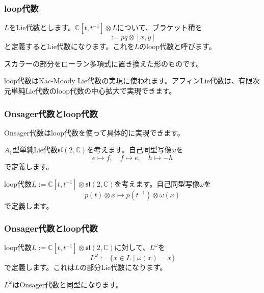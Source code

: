 \documentclass{beamer}
\begin{document}
\begin{frame}
    \frametitle{loop代数}

    \begin{definition}[loop代数]
        $L$をLie代数とします。$ℂ[t,t^{-1}]⊗L$について、ブラケット積を
        \begin{equation}
            [p⊗x,q⊗y]:=pq⊗[x,y]
        \end{equation}
        と定義するとLie代数になります。これを$L$のloop代数と呼びます。
    \end{definition}

    スカラーの部分をローラン多項式に置き換えた形のものです。

    \bigskip

    loop代数はKac-Moody Lie代数の実現に使われます。アフィンLie代数は、有限次元単純Lie代数のloop代数の中心拡大で実現できます。
\end{frame}

\begin{frame}
    \frametitle{Onsager代数とloop代数}

    Onsager代数はloop代数を使って具体的に実現できます。

    \bigskip

    \begin{definition}
        $A_1$型単純Lie代数$\mathfrak{sl}(2,ℂ)$を考えます。自己同型写像$ω$を
        \begin{equation}
            e↦f, \quad f↦e, \quad h↦-h
        \end{equation}
        で定義します。
    \end{definition}

    \begin{definition}
        loop代数$L:=ℂ[t,t^{-1}]⊗\mathfrak{sl}(2,ℂ)$を考えます。自己同型写像$ω$を
        \begin{equation}
            p(t)⊗x↦p(t^{-1})⊗ω(x)
        \end{equation}
        で定義します。
    \end{definition}
\end{frame}

\begin{frame}
    \frametitle{Onsager代数とloop代数}

    \begin{definition}
        loop代数$L:=ℂ[t,t^{-1}]⊗\mathfrak{sl}(2,ℂ)$に対して、$L^ω$を
        \begin{equation}
            L^ω:=\{x∈L∣ω(x)=x\}
        \end{equation}
        で定義します。これは$L$の部分Lie代数になります。
    \end{definition}

    \begin{theorem}[Onsager代数とloop代数の同型]
        $L^ω$はOnsager代数と同型になります。
    \end{theorem}
\end{frame}
\end{document}
